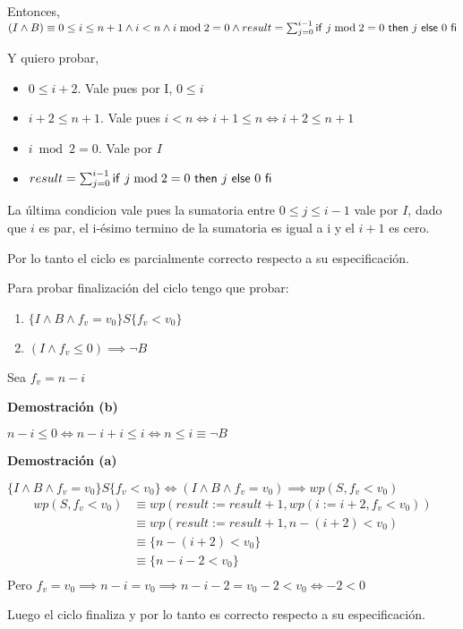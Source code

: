 Entonces, $ (I \wedge B) \equiv 0 \leq i \leq n+1 \wedge i<n \wedge i \bmod 2 = 0\wedge result = \sum_{j = 0}^{i-1}\mathsf{if}\ j \bmod 2 = 0\ \mathsf{then}\ j\ \mathsf{else}\ 0\ \mathsf{fi} $

Y quiero probar,
\begin{itemize}
    \item $ 0 \leq i + 2 $. Vale pues por I, $ 0 \leq i $
    \item $ i+2 \leq n+1 $. Vale pues $ i < n \iff i+1 \leq n \iff i+2 \leq n+1 $
    \item $ i \bmod 2 = 0 $. Vale por $I$
    \item $ result = \sum_{j = 0}^{i-1}\mathsf{if}\ j \bmod 2 = 0\ \mathsf{then}\ j\ \mathsf{else}\ 0\ \mathsf{fi} $
\end{itemize}

La última condicion vale pues la sumatoria entre $ 0 \leq j \leq i-1 $ vale por $I$, dado que $i$ es par, el i-ésimo termino de la sumatoria es igual a i y el $i+1$ es cero.

Por lo tanto el ciclo es parcialmente correcto respecto a su especificación.

Para probar finalización del ciclo tengo que probar:
\begin{enumerate}[label=(\alph*)]
    \item $ \{ I \wedge B \wedge f_v = v_0 \} S \{ f_v < v_0 \} $
    \item $ (I \wedge f_v \leq 0) \implies \neg B $
\end{enumerate}

Sea $ f_v = n-i $

\textbf{Demostración (b)}

$ n-i \leq 0 \iff n-i+i \leq i \iff n \leq i \equiv \neg B $

\textbf{Demostración (a)}

$ \{ I \wedge B \wedge f_v = v_0 \} S \{ f_v < v_0 \} \iff (I \wedge B \wedge f_v = v_0) \implies wp(S, f_v < v_0) $
\begin{align*}
    wp(S, f_v < v_0) &\equiv wp(result := result + 1, wp(i := i+2, f_v < v_0)) \\
    &\equiv wp(result := result + 1, n-(i+2) < v_0 ) \\
    &\equiv \{ n-(i+2) < v_0 \} \\
    &\equiv \{ n-i-2 < v_0 \} \\
\end{align*}
Pero $ f_v = v_0 \implies n-i = v_0 \implies n-i-2 = v_0 -2 < v_0 \iff -2 < 0 $

Luego el ciclo finaliza y por lo tanto es correcto respecto a su especificación.

